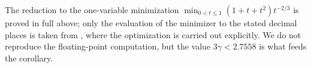 \begin{remark}\label{rem:cite-opt}
The reduction to the one-variable minimization $\min_{0<t\le1}(1+t+t^2)t^{-2/3}$ is
proved in full above; only the evaluation of the minimizer to the stated decimal
places is taken from \cite{ellenberggijswijt2017}, where the optimization is carried
out explicitly. We do not reproduce the floating-point computation, but the value
$3\gamma<2.7558$ is what feeds the corollary.
\end{remark}
